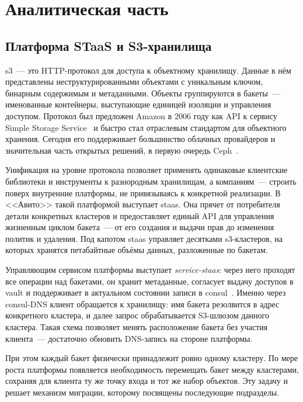 \section{Аналитическая часть}\label{sec:analysis}

\subsection{Платформа STaaS и S3-хранилища}\label{subsec:staas}

\gls{s3}~--- это HTTP-протокол для доступа к объектному хранилищу.
Данные в нём представлены неструктурированными объектами с уникальным ключом, бинарным содержимым и метаданными.
Объекты группируются в бакеты~--- именованные контейнеры, выступающие единицей изоляции и управления доступом.
Протокол был предложен Amazon в 2006 году как API к сервису Simple Storage Service~\cite{aws-s3} и быстро стал отраслевым стандартом для объектного хранения.
Сегодня его поддерживает большинство облачных провайдеров и значительная часть открытых решений, в первую очередь Ceph~\cite{weil2006ceph}.

Унификация на уровне протокола позволяет применять одинаковые клиентские библиотеки и инструменты к разнородным хранилищам, а компаниям~--- строить поверх внутренние платформы, не привязываясь к конкретной реализации.
В <<Авито>> такой платформой выступает \gls{staas}.
Она прячет от потребителя детали конкретных кластеров и предоставляет единый API для управления жизненным циклом бакета~--- от его создания и выдачи прав до изменения политик и удаления.
Под капотом \gls{staas} управляет десятками \gls{s3}-кластеров, на которых хранятся петабайтные объёмы данных, разложенные по бакетам.

Управляющим сервисом платформы выступает \textit{service-staas}: через него проходят все операции над бакетами, он хранит метаданные, согласует выдачу доступов в \gls{vault} и поддерживает в актуальном состоянии записи в \gls{consul}~\cite{consul-docs}.
Именно через \gls{consul}-DNS клиент обращается к хранилищу: имя бакета резолвится в адрес конкретного кластера, и далее запрос обрабатывается S3-шлюзом данного кластера.
Такая схема позволяет менять расположение бакета без участия клиента~--- достаточно обновить DNS-запись на стороне платформы.

При этом каждый бакет физически принадлежит ровно одному кластеру.
По мере роста платформы появляется необходимость перемещать бакет между кластерами, сохраняя для клиента ту же точку входа и тот же набор объектов.
Эту задачу и решает механизм миграции, которому посвящены последующие подразделы.

